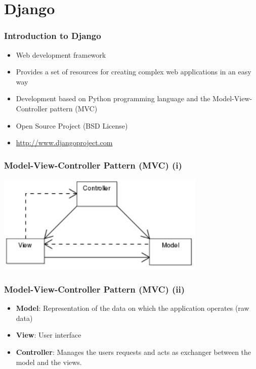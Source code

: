 \section{Django}

\begin{frame}
\frametitle{Introduction to Django}
\begin{itemize}
\item Web development framework
\item Provides a set of resources for creating complex web applications 
  in an easy way
\item Development based on Python programming language and the
 Model-View-Controller pattern (MVC)
\item Open Source Project (BSD License)
\item \url{http://www.djangoproject.com}
\end{itemize}
\end{frame}

\begin{frame}
\frametitle{Model-View-Controller Pattern (MVC) (i)}
\begin{center}
\includegraphics[width=10cm]{figs/MVC}
\end{center}
\end{frame}


\begin{frame}
\frametitle{Model-View-Controller Pattern (MVC) (ii)}
\begin{itemize}
\item \textbf{Model}: Representation of the data on which the application operates (raw data)
\item \textbf{View}: User interface
\item \textbf{Controller}: Manages the users requests and acts as exchanger between the model
  and the views.
\end{itemize}
\end{frame}


